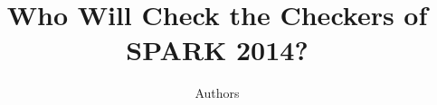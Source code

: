 \documentclass{llncs}
\begin{document}
\title{Who Will Check the Checkers of SPARK 2014?}


\author{Authors}


\maketitle













% 
% 

\end{document}

